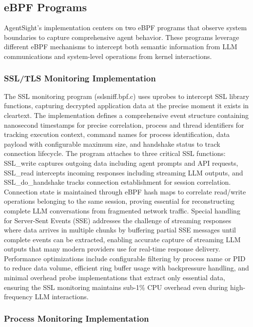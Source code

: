 \subsection{eBPF Programs}

AgentSight's implementation centers on two eBPF programs that observe system boundaries to capture comprehensive agent behavior. These programs leverage different eBPF mechanisms to intercept both semantic information from LLM communications and system-level operations from kernel interactions.

\subsubsection{SSL/TLS Monitoring Implementation}

The SSL monitoring program (sslsniff.bpf.c) uses uprobes to intercept SSL library functions, capturing decrypted application data at the precise moment it exists in cleartext. The implementation defines a comprehensive event structure containing nanosecond timestamps for precise correlation, process and thread identifiers for tracking execution context, command names for process identification, data payload with configurable maximum size, and handshake status to track connection lifecycle. The program attaches to three critical SSL functions: SSL\_write captures outgoing data including agent prompts and API requests, SSL\_read intercepts incoming responses including streaming LLM outputs, and SSL\_do\_handshake tracks connection establishment for session correlation. Connection state is maintained through eBPF hash maps to correlate read/write operations belonging to the same session, proving essential for reconstructing complete LLM conversations from fragmented network traffic. Special handling for Server-Sent Events (SSE) addresses the challenge of streaming responses where data arrives in multiple chunks by buffering partial SSE messages until complete events can be extracted, enabling accurate capture of streaming LLM outputs that many modern providers use for real-time response delivery. Performance optimizations include configurable filtering by process name or PID to reduce data volume, efficient ring buffer usage with backpressure handling, and minimal overhead probe implementations that extract only essential data, ensuring the SSL monitoring maintains sub-1\% CPU overhead even during high-frequency LLM interactions.

\subsubsection{Process Monitoring Implementation}

